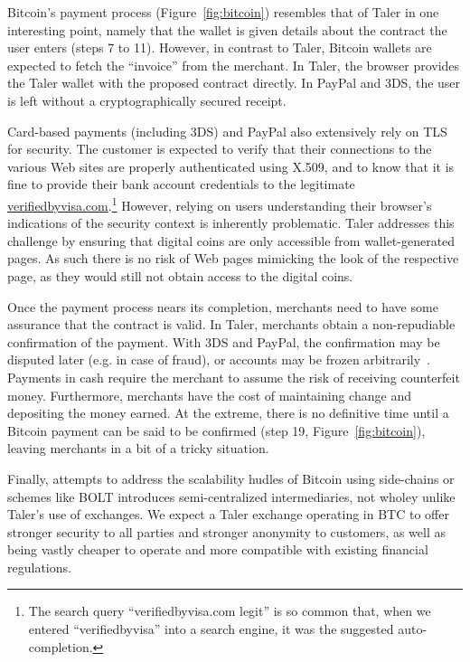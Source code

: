 \documentclass{llncs}
\begin{document}
Bitcoin's payment process (Figure~\ref{fig:bitcoin}) resembles that of
Taler in one interesting point, namely that the wallet is given
details about the contract the user enters (steps 7 to 11).
However, in contrast to Taler, Bitcoin wallets are expected
to fetch the ``invoice'' from the merchant. In Taler, the browser
provides the Taler wallet with the proposed contract directly.  In
PayPal and 3DS, the user is left without a cryptographically secured
receipt.

Card-based payments (including 3DS) and PayPal also extensively rely
on TLS for security.  The customer is expected to verify that their
connections to the various Web sites are properly authenticated using
X.509, and to know that it is fine to provide their bank account
credentials to the legitimate
\url{verifiedbyvisa.com}.\footnote{The search query
``verifiedbyvisa.com legit'' is so common that, when we entered
``verifiedbyvisa'' into a search engine, it was the suggested
auto-completion.}  However, relying on users understanding their
browser's indications of the security context is inherently
problematic.  Taler addresses this challenge by ensuring that digital
coins are only accessible from wallet-generated pages. As such
there is no risk of Web pages mimicking the look of the respective
page, as they would still not obtain access to the digital coins.

Once the payment process nears its completion, merchants need to have
some assurance that the contract is valid.  In Taler, merchants
obtain a non-repudiable confirmation of the payment.  With 3DS and
PayPal, the confirmation may be disputed later (e.g. in case of
fraud), or accounts may be frozen arbitrarily~\cite{diaspora2011}.
Payments in cash require the merchant to assume the risk of receiving
counterfeit money.
Furthermore, merchants have the cost of maintaining change and depositing
the money earned.  At the extreme, there is no definitive time until a
Bitcoin payment can be said to be confirmed (step 19, Figure~\ref{fig:bitcoin}),
leaving merchants in a bit of a tricky situation.

Finally, attempts to address the scalability hudles of Bitcoin using
side-chains or schemes like BOLT introduces semi-centralized
intermediaries, not wholey unlike Taler's use of exchanges.
We expect a Taler exchange operating in BTC to offer stronger security
to all parties and stronger anonymity to customers, as well as being
vastly cheaper to operate and more compatible with existing financial regulations.
\end{document}
